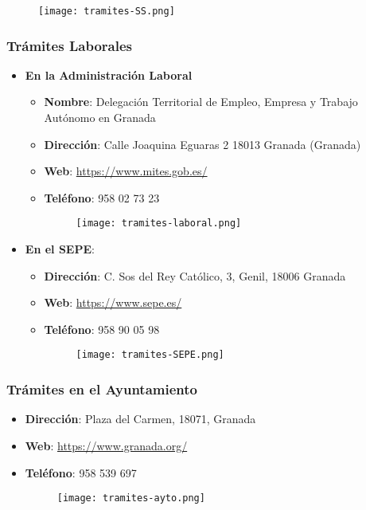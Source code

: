 \begin{figure}[H]
    \centering
    \texttt{[image: tramites-SS.png]}
\end{figure}

\subsubsection*{Trámites Laborales}

\begin{itemize}
    \item \textbf{En la Administración Laboral}
    \begin{itemize}
        \item \textbf{Nombre}: Delegación Territorial de Empleo, Empresa y Trabajo Autónomo en Granada
        \item \textbf{Dirección}: Calle Joaquina Eguaras 2 18013 Granada (Granada)
        \item \textbf{Web}: \url{https://www.mites.gob.es/}
        \item \textbf{Teléfono}: 958 02 73 23

        \begin{figure}[H]
            \centering
            \texttt{[image: tramites-laboral.png]}
        \end{figure}
    \end{itemize}
    \item \textbf{En el SEPE}:
    \begin{itemize}
        \item \textbf{Dirección}:  C. Sos del Rey Católico, 3, Genil, 18006 Granada
        \item \textbf{Web}: \url{https://www.sepe.es/}
        \item \textbf{Teléfono}: 958 90 05 98

        \begin{figure}[H]
            \centering
            \texttt{[image: tramites-SEPE.png]}
        \end{figure}
    \end{itemize}
\end{itemize}

\subsubsection*{Trámites en el Ayuntamiento}
\begin{itemize}
    \item \textbf{Dirección}:  Plaza del Carmen, 18071, Granada
    \item \textbf{Web}: \url{https://www.granada.org/}
    \item \textbf{Teléfono}: 958 539 697

    \begin{figure}[H]
        \centering
        \texttt{[image: tramites-ayto.png]}
    \end{figure}
\end{itemize}

